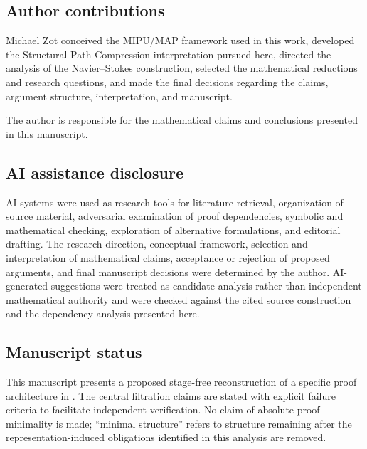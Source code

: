 \documentclass[11pt]{article}
\numberwithin{equation}{section}
\theoremstyle{highend}
\theoremstyle{definition}
\begin{document}
\subsection*{Author contributions}
Michael Zot conceived the MIPU/MAP framework used in this work, developed the Structural Path Compression interpretation pursued here, directed the analysis of the Navier--Stokes construction, selected the mathematical reductions and research questions, and made the final decisions regarding the claims, argument structure, interpretation, and manuscript.

The author is responsible for the mathematical claims and conclusions presented in this manuscript.

\subsection*{AI assistance disclosure}
AI systems were used as research tools for literature retrieval, organization of source material, adversarial examination of proof dependencies, symbolic and mathematical checking, exploration of alternative formulations, and editorial drafting. The research direction, conceptual framework, selection and interpretation of mathematical claims, acceptance or rejection of proposed arguments, and final manuscript decisions were determined by the author. AI-generated suggestions were treated as candidate analysis rather than independent mathematical authority and were checked against the cited source construction and the dependency analysis presented here.

\subsection*{Manuscript status}
This manuscript presents a proposed stage-free reconstruction of a specific proof architecture in \cite{OpenAI2026NS}. The central filtration claims are stated with explicit failure criteria to facilitate independent verification. No claim of absolute proof minimality is made; ``minimal structure'' refers to structure remaining after the representation-induced obligations identified in this analysis are removed.
\end{document}
